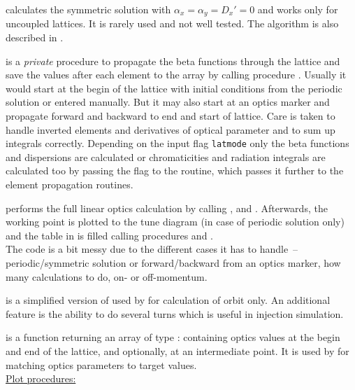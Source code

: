 \documentclass[12pt]{article}
\newcommand\code[1]{{\tt #1}}
\newcommand{\unico}[1]{{\color{burntorange}\code{#1}}}
\newcommand{\vrcod}[2]{\opauni{#1}:\unico{#2}}
\newcommand{\opagui}[1]{\colorbox{blue!20}{{\color{black}\code{#1}}}}
\newcommand{\ogui}[1]{\hyperref[#1]{\opagui{#1}}}
\newcommand{\opauni}[1]{\colorbox{orange!30}{{\color{black}\code{#1}}}}
\newcommand{\ouni}[1]{\hyperref[#1]{\opauni{#1}}}
\newcommand{\todo}[1]{{\color{red} #1}}
\begin{document}
{\unico{Symmetric} calculates the symmetric solution with 
$\alpha_x=\alpha_y=D_x'=0$ and works only for uncoupled lattices. It is rarely used and not well tested. The algorithm is also described in \cite{kwille}.

\unico{LinOp} is a {\em private} procedure to propagate the beta functions through the lattice and save the values after each element to the \unico{Opval} array by calling procedure \unico{StoVar}. Usually it would start at the begin of the lattice with initial conditions from the periodic solution or entered manually. But it may also start at an optics marker and propagate forward and backward to end and start of lattice. Care is taken to handle inverted elements and derivatives of optical parameter and to sum up integrals correctly. Depending on the input flag \code{latmode} only the beta functions and dispersions are calculated or chromaticities and radiation integrals are calculated too by passing the flag to the \unico{Lattel} routine, which passes it further to the element propagation routines.

\unico{OpticCalc} performs the full linear optics calculation by calling \unico{ClosedOrbit}, \unico{Periodic} and \unico{LinOp}. Afterwards, the working point is plotted to the tune diagram (in case of periodic solution only) and the table in \ogui{opalinop} is filled calling procedures \unico{FillBeamTab} and \unico{FillBetaTab}. \\
\todo{The code is a bit messy due to the different cases it has to handle~-- periodic/symmetric solution or forward/backward from an optics marker, how many calculations to do, on- or off-momentum.} 

\unico{OrbitCalc} is a simplified version of \unico{OpticCalc} used by \ogui{opaorbit} for calculation of orbit only. An additional feature is the ability to do several turns which is useful in injection simulation.

\unico{MatchValues} is a function returning an array of type \vrcod{globlib}{MatchFuncType} containing optics values at the begin and end of the lattice, and optionally, at an intermediate point. It is used by \ouni{omatching} for matching optics parameters to target values.\\

\underline{Plot procedures:}

}
\end{document}
